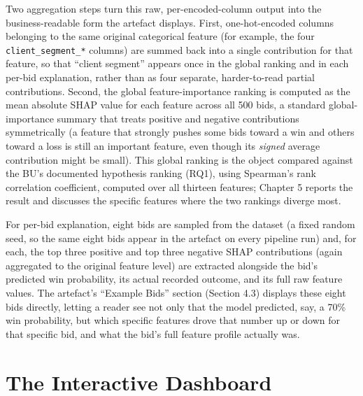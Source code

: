 \documentclass[12pt,oneside]{report}
\begin{document}
Two aggregation steps turn this raw, per-encoded-column output into the
business-readable form the artefact displays. First, one-hot-encoded
columns belonging to the same original categorical feature (for example,
the four \texttt{client\_segment\_*} columns) are summed back into a
single contribution for that feature, so that ``client segment'' appears
once in the global ranking and in each per-bid explanation, rather than
as four separate, harder-to-read partial contributions. Second, the
global feature-importance ranking is computed as the mean absolute SHAP
value for each feature across all 500 bids, a standard global-importance
summary that treats positive and negative contributions symmetrically (a
feature that strongly pushes some bids toward a win and others toward a
loss is still an important feature, even though its \emph{signed}
average contribution might be small). This global ranking is the object
compared against the BU's documented hypothesis ranking (RQ1), using
Spearman's rank correlation coefficient, computed over all thirteen
features; Chapter 5 reports the result and discusses the specific
features where the two rankings diverge most.

For per-bid explanation, eight bids are sampled from the dataset (a
fixed random seed, so the same eight bids appear in the artefact on
every pipeline run) and, for each, the top three positive and top three
negative SHAP contributions (again aggregated to the original feature
level) are extracted alongside the bid's predicted win probability, its
actual recorded outcome, and its full raw feature values. The artefact's
``Example Bids'' section (Section 4.3) displays these eight bids
directly, letting a reader see not only that the model predicted, say, a
70\% win probability, but which specific features drove that number up
or down for that specific bid, and what the bid's full feature profile
actually was.

\hypertarget{the-interactive-dashboard}{%
\section{The Interactive Dashboard}\label{the-interactive-dashboard}}
\end{document}
